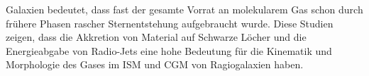 Galaxien bedeutet, dass fast der gesamte Vorrat an molekularem Gas schon durch fr\"uhere Phasen rascher Sternentstehung aufgebraucht wurde. Diese Studien zeigen, dass die Akkretion von Material auf Schwarze L\"ocher und die Energieabgabe von Radio-Jets eine hohe Bedeutung f\"ur die Kinematik und Morphologie des Gases im ISM und CGM von Ragiogalaxien haben.